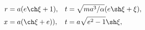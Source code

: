 \begin{align}
	r &= a(e\ch\xi+1), & t&=\sqrt{ma^3/\alpha}(e\sh\xi+\xi), \\
	x &= a(\ch\xi+e)), & t&=a\sqrt{e^2-1}\sh\xi,
\end{align}
